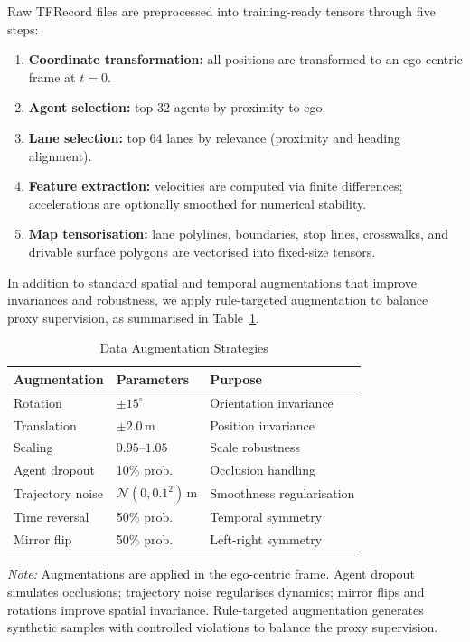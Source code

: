 Raw TFRecord files are preprocessed into training-ready tensors through five steps:
\begin{enumerate}
    \item \textbf{Coordinate transformation:} all positions are transformed to an ego-centric frame at $t{=}0$.
    \item \textbf{Agent selection:} top 32 agents by proximity to ego.     
    \item \textbf{Lane selection:} top 64 lanes by relevance (proximity and heading alignment).
    \item \textbf{Feature extraction:} velocities are computed via finite differences; accelerations are optionally smoothed for numerical stability.
    \item \textbf{Map tensorisation:} lane polylines, boundaries, stop lines, crosswalks, and drivable surface polygons are vectorised into fixed-size tensors.
\end{enumerate}

\noindent
In addition to standard spatial and temporal augmentations that improve invariances and robustness, we apply rule-targeted augmentation to balance proxy supervision, as summarised in Table~\ref{tab:data_augmentation}.

\begin{table}[h]
\centering
\caption{Data Augmentation Strategies}
\label{tab:data_augmentation}
\begin{tabular}{llp{4cm}}
\toprule
\textbf{Augmentation} & \textbf{Parameters} & \textbf{Purpose} \\
\midrule
Rotation & $\pm 15^\circ$ & Orientation invariance \\
Translation & $\pm 2.0\,\mathrm{m}$ & Position invariance \\
Scaling & $0.95$--$1.05$ & Scale robustness \\
Agent dropout & 10\% prob. & Occlusion handling \\
Trajectory noise & $\mathcal{N}(0, 0.1^2)\,\mathrm{m}$ & Smoothness regularisation \\
Time reversal & 50\% prob. & Temporal symmetry \\
Mirror flip & 50\% prob. & Left-right symmetry \\
\bottomrule
\end{tabular}
\vspace{2mm}
\footnotesize
\textit{Note:} Augmentations are applied in the ego-centric frame.  Agent dropout simulates occlusions; trajectory noise regularises dynamics; mirror flips and rotations improve spatial invariance.  Rule-targeted augmentation generates synthetic samples with controlled violations to balance the proxy
supervision.
\end{table}

